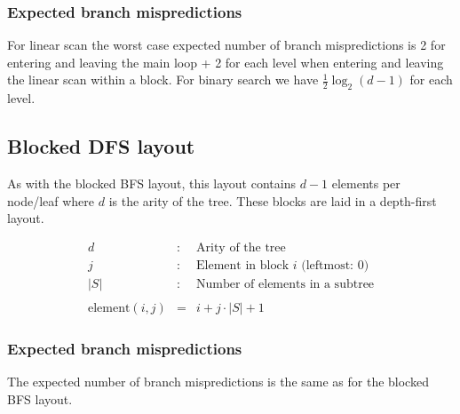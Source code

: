 \subsubsection*{Expected branch mispredictions}

For linear scan the worst case expected number of branch mispredictions is 2 for entering and leaving the main loop + 2 for each level when entering and leaving the linear scan within a block. For binary search we have $\frac{1}{2} \log_2 (d-1)$ for each level.

\subsection{Blocked DFS layout}

As with the blocked BFS layout, this layout contains $d - 1$ elements per node/leaf where $d$ is the arity of the tree. These blocks are laid in a depth-first layout.

\begin{eqnarray*}
d & : & \textrm{Arity of the tree} \\
j & : & \textrm{Element in block $i$ (leftmost: $0$)} \\
|S| & : & \textrm{Number of elements in a subtree} \\
\\
\mathrm{element}(i, j) & = & i + j\cdot |S| + 1
\end{eqnarray*}

\subsubsection*{Expected branch mispredictions}

The expected number of branch mispredictions is the same as for the blocked BFS layout.